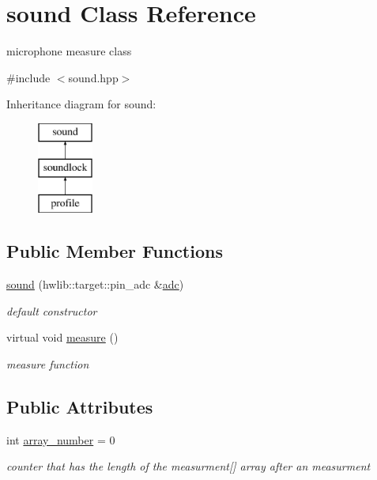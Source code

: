 \hypertarget{classsound}{}\section{sound Class Reference}
\label{classsound}


microphone measure class  




{\ttfamily \#include $<$sound.\+hpp$>$}

Inheritance diagram for sound\+:\begin{figure}[H]
\begin{center}
\leavevmode
\includegraphics[height=3.000000cm]{classsound}
\end{center}
\end{figure}
\subsection*{Public Member Functions}
\begin{DoxyCompactItemize}
\item 
\hyperlink{classsound_adb8acce21f8278fbf04134748bf8b4d8}{sound} (hwlib\+::target\+::pin\+\_\+adc \&\hyperlink{classsound_a1b4c38e994daa1b3e9006852d3d9242a}{adc})
\begin{DoxyCompactList}\small\item\em default constructor \end{DoxyCompactList}\item 
virtual void \hyperlink{classsound_a40bc8ced8bd7071f1c727a9d4845aade}{measure} ()
\begin{DoxyCompactList}\small\item\em measure function \end{DoxyCompactList}\end{DoxyCompactItemize}
\subsection*{Public Attributes}
\begin{DoxyCompactItemize}
\item 
int \hyperlink{classsound_a5b5e59c09240ddf40827f7c12fafbbad}{array\+\_\+number} = 0\hypertarget{classsound_a5b5e59c09240ddf40827f7c12fafbbad}{}\label{classsound_a5b5e59c09240ddf40827f7c12fafbbad}

\begin{DoxyCompactList}\small\item\em counter that has the length of the measurment\mbox{[}\mbox{]} array after an measurment \end{DoxyCompactList}\end{DoxyCompactItemize}
